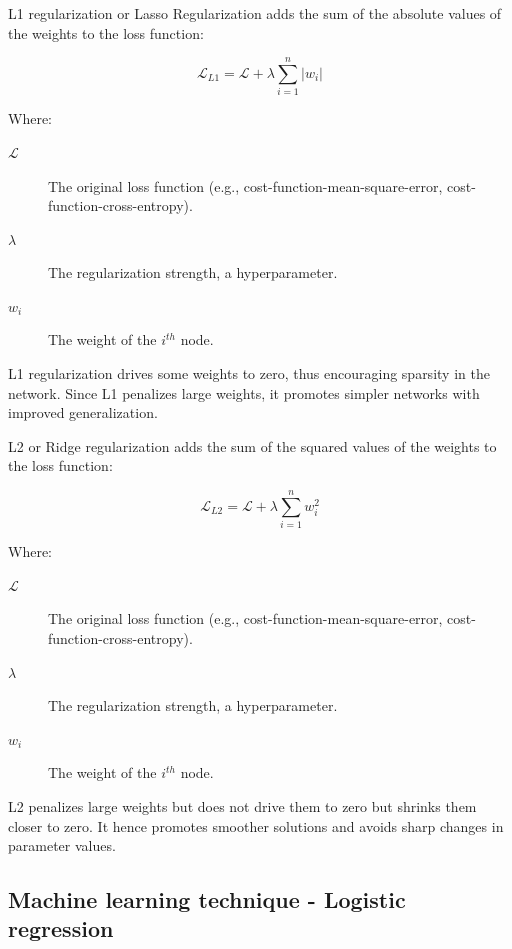		L1 regularization or Lasso Regularization adds the sum of the absolute values of the weights to the loss function:
		
		\begin{equation}
			\mathcal{L}_{L1} = \mathcal{L} + \lambda \sum_{i=1}^n |w_i|
		\end{equation}

		
		Where:
		\begin{description}
			\item[$\mathcal{L}$] The original loss function (e.g., cost-function-mean-square-error, cost-function-cross-entropy).
			\item[$\lambda$] The regularization strength, a hyperparameter.
			\item[$w_i$] The weight of the $i^{th}$ node.
		\end{description}
		\bigskip
		
		L1 regularization drives some weights to zero, thus encouraging sparsity in the network. Since L1 penalizes large weights, it promotes simpler networks with improved generalization.
		
		L2 or Ridge regularization adds the sum of the squared values of the weights to the loss function:
		

		\begin{equation}
			\mathcal{L}_{L2} = \mathcal{L} + \lambda \sum_{i=1}^n w_i^2
		\end{equation}
		
		Where:
		\begin{description}
			\item[$\mathcal{L}$] The original loss function (e.g., cost-function-mean-square-error, cost-function-cross-entropy).
			\item[$\lambda$] The regularization strength, a hyperparameter.
			\item[$w_i$] The weight of the $i^{th}$ node.
		\end{description}
		\bigskip
		
		
		L2 penalizes large weights but does not drive them to zero but shrinks them closer to zero. It hence promotes smoother solutions and avoids sharp changes in parameter values.




	\bigskip
	\subsection{Machine learning technique - Logistic regression}


